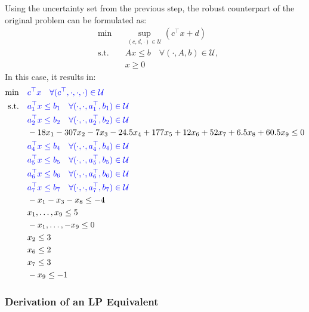 \documentclass[a4paper,12pt]{article}
\begin{document}
Using the uncertainty set from the previous step, the robust counterpart of the original problem can be formulated as:
\[
\begin{aligned}
    &\min && \sup_{(c, d, \cdot) \in \mathcal{U}} \left(c^\top x + d\right) \\
    &\text{s.t.} && Ax \leq b \quad \forall (\cdot, A, b) \in \mathcal{U}, \\
    & && x \geq 0
\end{aligned}
\]
In this case, it results in:
\[
\begin{aligned}
   \begin{aligned}
    \min & \quad \textcolor{blue}{c^\top x \quad \forall (c^\top, \cdot,\cdot,\cdot) \in \mathcal{U}} \\ %
    \text{s.t.} & \quad \textcolor{blue}{a_1^\top x \leq b_1 \quad \forall (\cdot, \cdot, a_1^\top, b_1) \in \mathcal{U}} \\
    & \quad \textcolor{blue}{a_2^\top x \leq b_2 \quad \forall (\cdot, \cdot, a_2^\top, b_2) \in \mathcal{U}} \\
    & \quad -18x_1 - 307x_2 - 7x_3 - 24.5x_4 + 177x_5 + 12x_6 + 52x_7 + 6.5x_8 + 60.5x_9 \leq 0 \\
    & \quad \textcolor{blue}{a_4^\top x \leq b_4 \quad \forall (\cdot, \cdot, a_4^\top, b_4) \in \mathcal{U}} \\
    & \quad \textcolor{blue}{a_5^\top x \leq b_5 \quad \forall (\cdot, \cdot, a_5^\top, b_5) \in \mathcal{U}} \\
    & \quad \textcolor{blue}{a_6^\top x \leq b_6 \quad \forall (\cdot, \cdot, a_6^\top, b_6) \in \mathcal{U}} \\
    & \quad \textcolor{blue}{a_7^\top x \leq b_7 \quad \forall (\cdot, \cdot, a_7^\top, b_7) \in \mathcal{U}}\\
    & \quad -x_1 - x_3 - x_8 \leq -4 \\
    & \quad x_1, \dots, x_9 \leq 5 \\
    & \quad - x_1, \dots, - x_9 \leq 0 \\
    & \quad x_2 \leq 3 \\
    & \quad x_6 \leq 2 \\
    & \quad x_7 \leq 3 \\
    & \quad - x_9 \leq - 1
\end{aligned}
\end{aligned}
\]

\subsubsection*{Derivation of an LP Equivalent}
\end{document}

